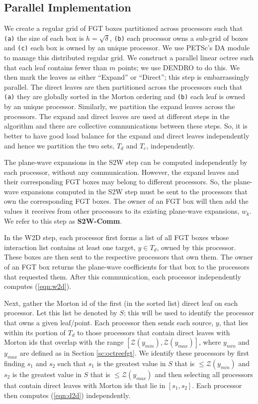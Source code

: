 
\subsection{Parallel Implementation}
\label{sc:parallelnufgt}

We create a regular grid of FGT boxes partitioned across processors such that 
 {\tt{(a)}} the size of each box is $h = \sqrt{\delta}$, {\tt{(b)}} each processor owns a sub-grid of boxes and
 {\tt{(c)}} each box is owned by an unique processor.  We use PETSc's \cite{petsc-user-ref, petsc-home-page} DA
 module to manage this distributed regular grid. We construct a parallel linear octree such that each leaf
 contains fewer than $m$ points; we use DENDRO \cite{dendro} to do this. We then mark the leaves as either
 ``Expand'' or ``Direct''; this step is embarrassingly parallel. The direct leaves are then partitioned across 
 the processors such that {\tt{(a)}} they are globally sorted in the Morton ordering and {\tt{(b)}} each leaf 
 is owned by an unique processor. Similarly, we partition the expand leaves across the processors. The expand
 and direct leaves are used at different steps in the algorithm and there are collective communications between
 these steps. So, it is better to have good load balance for the expand and direct leaves independently and hence
 we partition the two sets, $T_d$ and $T_e$, independently.

The plane-wave expansions in the S2W step can be computed independently by each processor, without any communication.
However, the expand leaves and their corresponding FGT boxes may belong to different processors. So, the plane-wave 
expansions computed in the S2W step must be sent to the processors that own the corresponding FGT boxes. The owner of
an FGT box will then add the values it receives from other processors to its existing plane-wave expansions, $w_k$. We 
refer to this step as {\textbf{S2W-Comm}}.

In the W2D step, each processor first forms a list of all FGT boxes whose interaction list contains at least one 
target, $y \in T_d$, owned by this processor. These boxes are then sent to the respective processors that own them. The
owner of an FGT box returns the plane-wave coefficients for that box to the processors that requested them. After this
communication, each processor independently computes (\ref{eqn:w2d}).

Next, gather the Morton id of the first (in the sorted list) direct leaf on each processor. Let this list
be denoted by $S$; this will be used to identify the processor that owns a given leaf/point. Each 
processor then sends each source, $y$, that lies within its portion of $T_d$ to those processors 
that contain direct leaves with Morton ids that overlap with the range $[\mathcal{Z}(y_{min}), \mathcal{Z}(y_{max})]$, where
 $y_{min}$ and $y_{max}$ are defined as in Section \ref{sc:octreefgt}. We identify these processors 
 by first finding $s_1$ and $s_2$ such that $s_1$ is the greatest value in $S$ that is $\leq \mathcal{Z}(y_{min})$ and 
 $s_2$ is the greatest value in $S$ that is $\leq \mathcal{Z}(y_{max})$ and then selecting all processors that contain
 direct leaves with Morton ids that lie in $[s_1, s_2]$. Each processor then computes (\ref{eqn:d2d}) independently.

